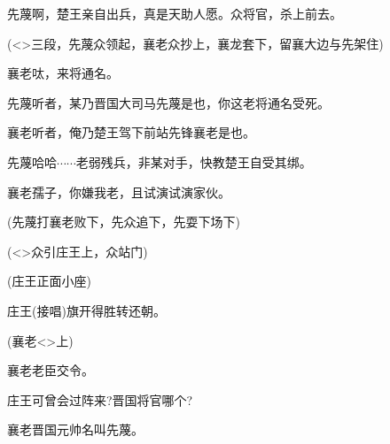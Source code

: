 {先蔑\hspace{30pt}啊，楚王亲自出兵，真是天助人愿。众将官，杀上前去。

(\textless{}\!\textgreater{}{\hwfs 三段}，先蔑众{\hwfs 领起}，襄老众{\hwfs 抄上}，襄{\hwfs 龙套下}，{\hwfs 留}襄{\hwfs 大边与}先{\hwfs 架住})

襄老\hspace{30pt}呔，来将通名。

先蔑\hspace{30pt}听者，某乃晋国大司马先蔑是也，你这老将通名受死。

襄老\hspace{30pt}听者，俺乃楚王驾下前站先锋襄老是也。

先蔑\hspace{30pt}哈哈$\cdots{}\cdots{}$老弱残兵，非某对手，快教楚王自受其绑。

襄老\hspace{30pt}孺子，你嫌我老，且试演试演家伙。

(先蔑{\hwfs 打}襄老{\hwfs 败下}，先众{\hwfs 追下}，先{\hwfs 耍下场下})

\vspace{5pt}

(\textless{}\!\textgreater{}众{\hwfs 引}庄王{\hwfs 上}，众{\hwfs 站门})


(庄王{\hwfs 正面小座})

庄王\hspace{30pt}({\akai 接唱})旗开得胜转还朝。

(襄老\textless{}\!\textgreater{}{\hwfs 上})


襄老\hspace{30pt}老臣交令。

庄王\hspace{30pt}可曾会过阵来?晋国将官哪个?

襄老\hspace{30pt}晋国元帅名叫先蔑。

}
